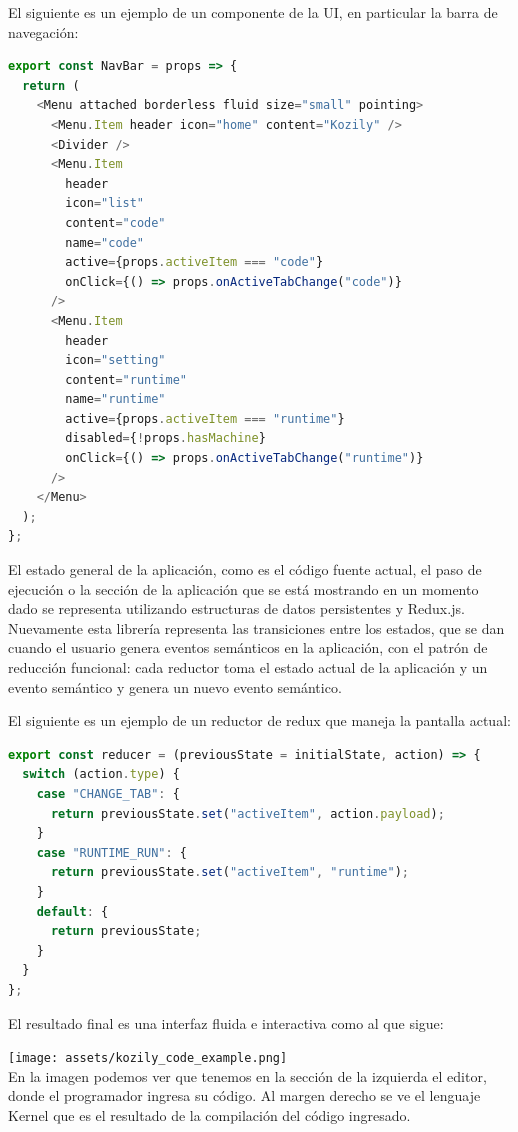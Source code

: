 \documentclass[a4paper,11pt]{article}
\begin{document}
El siguiente es un ejemplo de un componente de la UI, en particular la barra de navegación:

\begin{lstlisting}[language=javascript]
export const NavBar = props => {
  return (
    <Menu attached borderless fluid size="small" pointing>
      <Menu.Item header icon="home" content="Kozily" />
      <Divider />
      <Menu.Item
        header
        icon="list"
        content="code"
        name="code"
        active={props.activeItem === "code"}
        onClick={() => props.onActiveTabChange("code")}
      />
      <Menu.Item
        header
        icon="setting"
        content="runtime"
        name="runtime"
        active={props.activeItem === "runtime"}
        disabled={!props.hasMachine}
        onClick={() => props.onActiveTabChange("runtime")}
      />
    </Menu>
  );
};
\end{lstlisting}

El estado general de la aplicación, como es el código fuente actual, el paso de ejecución o la sección de la aplicación que se está mostrando en un momento dado se representa utilizando estructuras de datos persistentes y Redux.js\cite{redux}. Nuevamente esta librería representa las transiciones entre los estados, que se dan cuando el usuario genera eventos semánticos en la aplicación, con el patrón de reducción funcional: cada reductor toma el estado actual de la aplicación y un evento semántico y genera un nuevo evento semántico.

El siguiente es un ejemplo de un reductor de redux que maneja la pantalla actual:

\begin{lstlisting}[language=javascript]
export const reducer = (previousState = initialState, action) => {
  switch (action.type) {
    case "CHANGE_TAB": {
      return previousState.set("activeItem", action.payload);
    }
    case "RUNTIME_RUN": {
      return previousState.set("activeItem", "runtime");
    }
    default: {
      return previousState;
    }
  }
};
\end{lstlisting}

El resultado final es una interfaz fluida e interactiva como al que sigue:

\texttt{[image: assets/kozily\_code\_example.png]}\\[1cm]

En la imagen podemos ver que tenemos en la sección de la izquierda el editor, donde el programador ingresa su código. Al margen derecho se ve el lenguaje Kernel que es el resultado de la compilación del código ingresado.
\end{document}
